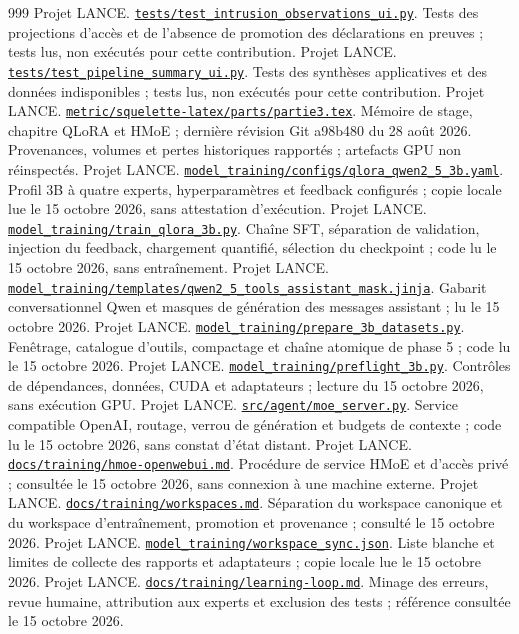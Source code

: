 \documentclass[11pt,a4paper]{article}
\newcommand{\source}[2]{\href{../../#1}{\nolinkurl{#1}}. #2}
\begin{document}
\begin{thebibliography}{999}
 Projet LANCE. \source{tests/test_intrusion_observations_ui.py}{Tests des projections d'accès et de l'absence de promotion des déclarations en preuves ; tests lus, non exécutés pour cette contribution.}
 Projet LANCE. \source{tests/test_pipeline_summary_ui.py}{Tests des synthèses applicatives et des données indisponibles ; tests lus, non exécutés pour cette contribution.}
 Projet LANCE. \source{metric/squelette-latex/parts/partie3.tex}{Mémoire de stage, chapitre QLoRA et HMoE ; dernière révision Git a98b480 du 28 août 2026. Provenances, volumes et pertes historiques rapportés ; artefacts GPU non réinspectés.}
 Projet LANCE. \source{model_training/configs/qlora_qwen2_5_3b.yaml}{Profil 3B à quatre experts, hyperparamètres et feedback configurés ; copie locale lue le 15 octobre 2026, sans attestation d'exécution.}
 Projet LANCE. \source{model_training/train_qlora_3b.py}{Chaîne SFT, séparation de validation, injection du feedback, chargement quantifié, sélection du checkpoint ; code lu le 15 octobre 2026, sans entraînement.}
 Projet LANCE. \source{model_training/templates/qwen2_5_tools_assistant_mask.jinja}{Gabarit conversationnel Qwen et masques de génération des messages assistant ; lu le 15 octobre 2026.}
 Projet LANCE. \source{model_training/prepare_3b_datasets.py}{Fenêtrage, catalogue d'outils, compactage et chaîne atomique de phase 5 ; code lu le 15 octobre 2026.}
 Projet LANCE. \source{model_training/preflight_3b.py}{Contrôles de dépendances, données, CUDA et adaptateurs ; lecture du 15 octobre 2026, sans exécution GPU.}
 Projet LANCE. \source{src/agent/moe_server.py}{Service compatible OpenAI, routage, verrou de génération et budgets de contexte ; code lu le 15 octobre 2026, sans constat d'état distant.}
 Projet LANCE. \source{docs/training/hmoe-openwebui.md}{Procédure de service HMoE et d'accès privé ; consultée le 15 octobre 2026, sans connexion à une machine externe.}
 Projet LANCE. \source{docs/training/workspaces.md}{Séparation du workspace canonique et du workspace d'entraînement, promotion et provenance ; consulté le 15 octobre 2026.}
 Projet LANCE. \source{model_training/workspace_sync.json}{Liste blanche et limites de collecte des rapports et adaptateurs ; copie locale lue le 15 octobre 2026.}
 Projet LANCE. \source{docs/training/learning-loop.md}{Minage des erreurs, revue humaine, attribution aux experts et exclusion des tests ; référence consultée le 15 octobre 2026.}

\end{thebibliography}
\end{document}
